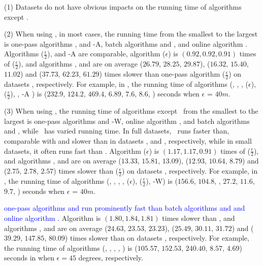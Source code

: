 {\sstab (1) {Datasets do not have obvious impacts on the running time of \lsa algorithms except \dagots. }

\sstab (2) When using \ped, in most cases, the running time from the smallest to the largest is one-pass algorithms \siped, \operb and {\operb-A}, batch algorithms \tpa and \dpa, and online algorithm \bqsa.
Algorithms \siped($\frac{\epsilon}{2}$), {\operb} and \operb-A are comparable, algorithm \siped(${\epsilon}$) is $(0.92, 0.92, 0.91)$ times of \siped($\frac{\epsilon}{2}$), and algorithms \tpa, \dpa and \bqsa are on average
($26.79$, $28.25$, $29.87$), ($16.32$, $15.40$, $11.02$) and ($37.73$, $62.23$, $61.29$)
times slower than one-pass algorithm \siped($\frac{\epsilon}{2}$) on datasets \dSets, respectively.
For example, in \mopsi, the running time of algorithms
(\tpa, \dpa, \bqsa, \siped(${\epsilon}$), \siped($\frac{\epsilon}{2}$), \operb, {\operb-A} ) is ($232.9$, $124.2$, $469.4$, $6.89$, $7.6$, $8.6$, ) seconds when $\epsilon$ = $40m$.

\sstab (3) When using \sed, the running time of algorithms except \dagots~from the smallest to the largest is one-pass algorithms \cised and {\cised-W}, online algorithm \squishe, and batch algorithms \tpa and \dpa, while \dagots~has varied running time. In full datasets, \dagots~runs faster than, comparable with and slower than \dpa in datasets \ucar, \geolife and \mopsi, respectively, while in small datasets, it often runs fast than \dpa. 
Algorithm \cised(${\epsilon}$) is $(1.17, 1.17, 0.91)$ times of \cised($\frac{\epsilon}{2}$), and algorithms \tpa, \dpa and \squishe are on average
 ($13.33$, $15.81$, $13.09$), ($12.93$, $10.64$, $8.79$) and
($2.75$, $2.78$, $2.57$) times slower than \cised($\frac{\epsilon}{2}$) on datasets \dSets, respectively.
%
For example, in \mopsi, the running time of algorithms
(\tpa, \dpa, {\dagots}, \squishe, \cised($\epsilon$), \cised($\frac{\epsilon}{2}$), {\cised-W}) is ($156.6$, $104.8$, , $27.2$, $11.6$, $9.7$, ) seconds when $\epsilon$ = $40m$.

 \textcolor{blue}{one-pass algorithms \intersec and \interval run prominently fast than batch algorithms \tpa and \dpa and online algorithm \opwa.}
%
%
Algorithm \interval is $(1.80, 1.84, 1.81)$ times slower than \intersec, and algorithms \tpa, \dpa and \opwa are on average
($24.63$, $23.53$, $23.23$), ($25.49$, $30.11$, $31.72$) and ($39.29$, $147.85$, $80.09$)
times slower than \intersec on datasets \dSets, respectively.
%
For example, the running time of algorithms
(\tpa, \dpa, \opwa, \interval, \intersec) is ($105.57$, $152.53$, $240.40$, $8.57$, $4.69$) seconds in \mopsi when
$\epsilon=45$ degrees, respectively.




}
